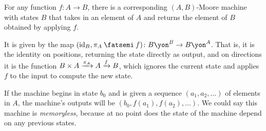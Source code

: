 \documentclass[Book-Poly]{subfiles}
\begin{document}
\begin{example}\label{ex.funs_to_moore}
For any function $f\colon A\to B$, there is a corresponding $(A,B)$-Moore machine with states $B$ that takes in an element of $A$ and returns the element of $B$ obtained by applying $f$. 

It is given by the map $(\id_B, \pi_A\then f)\colon B\yon^B\to B\yon^A$. That is, it is the identity on positions, returning the state directly as output, and on directions it is the function $B\times A\xrightarrow{\pi_A}A\xrightarrow{f} B$, which ignores the current state and applies $f$ to the input to compute the new state.

If the machine begins in state $b_0$ and is given a sequence $(a_1,a_2,\ldots)$ of elements in $A$, the machine's outputs will be $(b_0,f(a_1),f(a_2),\ldots)$. We could say this machine is \emph{memoryless}, because at no point does the state of the machine depend on any previous states.
\end{example}
\end{document}

